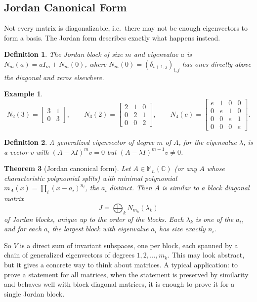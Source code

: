 \documentclass[12pt]{article}
\theoremstyle{breakplain}
\newtheorem{theorem}{Theorem}[section]
\theoremstyle{breakdef}
\newtheorem{definition}[theorem]{Definition}
\newtheorem*{example}{Example}
\theoremstyle{remark}
\begin{document}
\newpage
\subsection{Jordan Canonical Form}
Not every matrix is diagonalizable, i.e.\ there may not be enough eigenvectors to form a basis. The Jordan form describes exactly what happens instead.
\begin{definition}
    The \emph{Jordan block} of size $m$ and eigenvalue $a$ is $N_m(a)=aI_m + N_m(0)$, where $N_m(0)=(\delta_{i+1,j})_{i,j}$ has ones directly above the diagonal and zeros elsewhere.
\end{definition}
\begin{example}
    \[N_2(3)=\begin{bmatrix}3 & 1 \\
    0 & 3
    \end{bmatrix},\qquad
    N_3(2)=\begin{bmatrix}
        2 &1&0\\
        0 &2 &1 \\
        0 & 0 &2
    \end{bmatrix},\qquad
    N_4(e)=\begin{bmatrix} e & 1 & 0 & 0\\
        0 &e & 1 & 0 \\
        0 & 0 & e & 1  \\
       0 & 0 &0 &e
    \end{bmatrix}.\]
\end{example}
\begin{definition}
    A \emph{generalized eigenvector} of degree $m$ of $A$, for the eigenvalue $\lambda$, is a vector $v$ with $(A-\lambda I)^mv=0$ but $(A-\lambda I)^{m-1}v\neq 0$.
\end{definition}
\begin{theorem}[Jordan canonical form]
    Let $A\in\mathbb{M}_n(\mathbb{C})$ (or any $A$ whose characteristic polynomial splits) with minimal polynomial $m_A(x)=\prod_i(x-a_i)^{n_i}$, the $a_i$ distinct. Then $A$ is similar to a block diagonal matrix
    \[J=\bigoplus_k N_{m_k}(\lambda_k)\]
    of Jordan blocks, unique up to the order of the blocks. Each $\lambda_k$ is one of the $a_i$, and for each $a_i$ the largest block with eigenvalue $a_i$ has size exactly $n_i$.
\end{theorem}
So $V$ is a direct sum of invariant subspaces, one per block, each spanned by a chain of generalized eigenvectors of degrees $1,2,\ldots,m_k$.
This may look abstract, but it gives a concrete way to think about matrices. A typical application: to prove a statement for all matrices, when the statement is preserved by similarity and behaves well with block diagonal matrices, it is enough to prove it for a single Jordan block.
\end{document}
